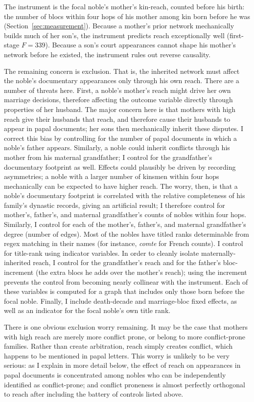 \documentclass[12pt]{article}
\theoremstyle{definition}
\theoremstyle{remark}
\begin{document}
The instrument is the focal noble's mother's kin-reach, counted before his birth: the number of blocs within four hops of his mother among kin born before he was (Section~\ref{sec:measurement}). Because a mother's prior network mechanically builds much of her son's, the instrument predicts reach exceptionally well (first-stage $F=339$). Because a son's court appearances cannot shape his mother's network before he existed, the instrument rules out reverse causality.

The remaining concern is exclusion. That is, the inherited network must affect the noble's documentary appearances only through his own reach. There are a number of threats here. First, a noble's mother's reach might drive her own marriage decisions, therefore affecting the outcome variable directly through properties of her husband. The major concern here is that mothers with high reach give their husbands that reach, and therefore cause their husbands to appear in papal documents; her sons then mechanically inherit these disputes. I correct this bias by controlling for the number of papal documents in which a noble's father appears. Similarly, a noble could inherit conflicts through his mother from his maternal grandfather; I control for the grandfather's documentary footprint as well. Effects could plausibly be driven by recording asymmetries; a noble with a larger number of kinsmen within four hops mechanically can be expected to have higher reach. The worry, then, is that a noble's documentary footprint is correlated with the relative completeness of his family's dynastic records, giving an artificial result; I therefore control for mother's, father's, and maternal grandfather's counts of nobles within four hops. Similarly, I control for each of the mother's, father's, and maternal grandfather's degree (number of edges). Most of the nobles have titled ranks determinable from regex matching in their names (for instance, \textit{comte} for French counts). I control for title-rank using indicator variables. In order to cleanly isolate maternally-inherited reach, I control for the grandfather's reach and for the father's bloc-increment (the extra blocs he adds over the mother's reach); using the increment prevents the control from becoming nearly collinear with the instrument. Each of these variables is computed for a graph that includes only those born before the focal noble. Finally, I include death-decade and marriage-bloc fixed effects, as well as an indicator for the focal noble's own title rank.

There is one obvious exclusion worry remaining. It may be the case that mothers with high reach are merely more conflict prone, or belong to more conflict-prone families. Rather than create arbitration, reach simply creates conflict, which happens to be mentioned in papal letters. This worry is unlikely to be very serious: as I explain in more detail below, the effect of reach on appearances in papal documents is concentrated among nobles who can be independently identified as conflict-prone; and conflict proneness is almost perfectly orthogonal to reach after including the battery of controls listed above. 
\end{document}
